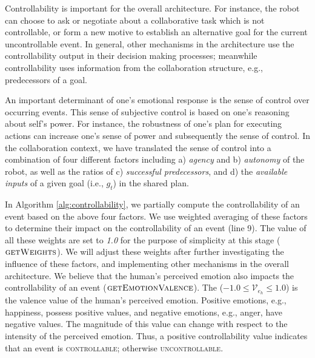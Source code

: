 Controllability is important for the overall architecture. For instance, the
robot can choose to ask or negotiate about a collaborative task which is not
controllable, or form a new motive to establish an alternative goal for the
current uncontrollable event. In general, other mechanisms in the architecture
use the controllability output in their decision making processes; meanwhile
controllability uses information from the collaboration structure, e.g.,
predecessors of a goal.

An important determinant of one's emotional response is the sense of control
over occurring events. This sense of subjective control is based on one's
reasoning about self's power. For instance, the robustness of one's plan for
executing actions can increase one's sense of power and subsequently the sense
of control. In the collaboration context, we have translated the sense of control
into a combination of four different factors including a) \textit{agency} and b)
\textit{autonomy} of the robot, as well as the ratios of c) \textit{successful
predecessors}, and d) the \textit{available inputs} of a given goal
(i.e., $\mathit{g}_{t}$) in the shared plan.

In Algorithm \ref{alg:controllability}, we partially compute the controllability
of an event based on the above four factors. We use weighted averaging of these
factors to determine their impact on the controllability of an event (line 9).
The value of all these weights are set to \textit{1.0} for the purpose of
simplicity at this stage (\textbf{$\Call{getWeights}{}$}). We will adjust these
weights after further investigating the influence of these factors, and
implementing other mechanisms in the overall architecture. We believe that the
human's perceived emotion also impacts the controllability of an event
(\textbf{$\Call{getEmotionValence}{}$}). The ($-1.0 \leq \mathcal{V}_{e_h} \leq
1.0$) is the valence value of the human's perceived emotion. Positive emotions,
e.g., happiness, possess positive values, and negative emotions, e.g., anger,
have negative values. The magnitude of this value can change with respect to the
intensity of the perceived emotion. Thus, a positive controllability value
indicates that an event is \textsc{controllable}; otherwise
\textsc{uncontrollable}.

% 

